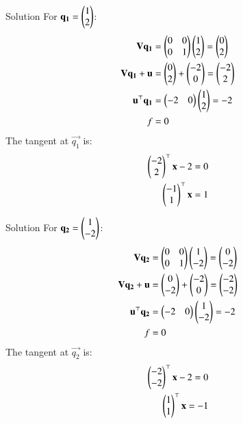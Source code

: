 \documentclass{beamer}
\begin{document}
\begin{frame}{Solution}
For $\vec{q_1} = \myvec{1 \\ 2}$:
\begin{align}
\vec{V}\vec{q_1} &= \myvec{0 & 0 \\ 0 & 1}\myvec{1 \\ 2} = \myvec{0\\ 2} \\
\vec{V}\vec{q_1} + \vec{u} &= \myvec{0 \\ 2} + \myvec{-2 \\ 0} = \myvec{-2 \\ 2} \\
\vec{u}^{\top}\vec{q_1} &= \myvec{-2 & 0}\myvec{1 \\ 2} = -2 \\
f &= 0
\end{align}
The tangent at $\vec{q_1}$ is:
\begin{align}
    \myvec{-2 \\ 2}^\top\vec{x} - 2 = 0\\
    \myvec{-1 \\ 1}^\top\vec{x}=1
    \end{align}
\end{frame}

\begin{frame}{Solution}
For $\vec{q_2} = \myvec{1 \\ -2}$:
\begin{align}
\vec{V}\vec{q_2} &= \myvec{0 & 0 \\ 0 & 1}\myvec{1 \\ -2} = \myvec{0 \\ -2} \\
\vec{V}\vec{q_2} + \vec{u} &= \myvec{0 \\ -2} + \myvec{-2 \\ 0} = \myvec{-2 \\ -2} \\
\vec{u}^{\top}\vec{q_2} &= \myvec{-2 & 0}\myvec{1 \\ -2} = -2 \\
f &= 0
\end{align}
The tangent at $\vec{q_2}$ is:
\begin{align}
    \myvec{-2 \\ -2}^\top\vec{x} - 2 = 0\\
    \myvec{1 \\ 1}^\top\vec{x}=-1
    \end{align}
\end{frame}
\end{document}

